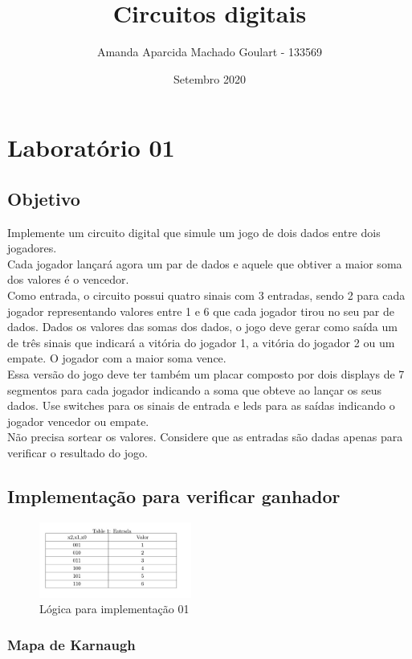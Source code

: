 \documentclass{article}
\title{Circuitos digitais}
\author{Amanda Aparcida Machado Goulart - 133569 }
\date{Setembro 2020}
\begin{document}
\maketitle

\section{Laboratório 01}
\subsection{Objetivo}
Implemente um circuito digital que simule um jogo de dois dados entre dois jogadores.
\\
Cada jogador lançará agora um par de dados e aquele que obtiver a maior soma dos valores é o
vencedor.
\\
Como entrada, o circuito possui quatro sinais com 3 entradas, sendo 2 para cada jogador representando
valores entre 1 e 6 que cada jogador tirou no seu par de dados.
Dados os valores das somas dos dados, o jogo deve gerar como saída um de três sinais que indicará a
vitória do jogador 1, a vitória do jogador 2 ou um empate. O jogador com a maior soma vence.
\\
Essa versão do jogo deve ter também um placar composto por dois displays de 7 segmentos para cada
jogador indicando a soma que obteve ao lançar os seus dados.
Use switches para os sinais de entrada e leds para as saídas indicando o jogador vencedor ou empate.
\\
Não precisa sortear os valores. Considere que as entradas são dadas apenas para verificar o resultado do
jogo.

\subsection{Implementação para verificar ganhador}

\begin{figure}[!h]
\centering
\includegraphics[width=5cm]{img01.jpeg}
\caption{Lógica para implementação 01}
\label{fig:CL_logo}
\end{figure}

\subsubsection{Mapa de Karnaugh}
\end{document}
